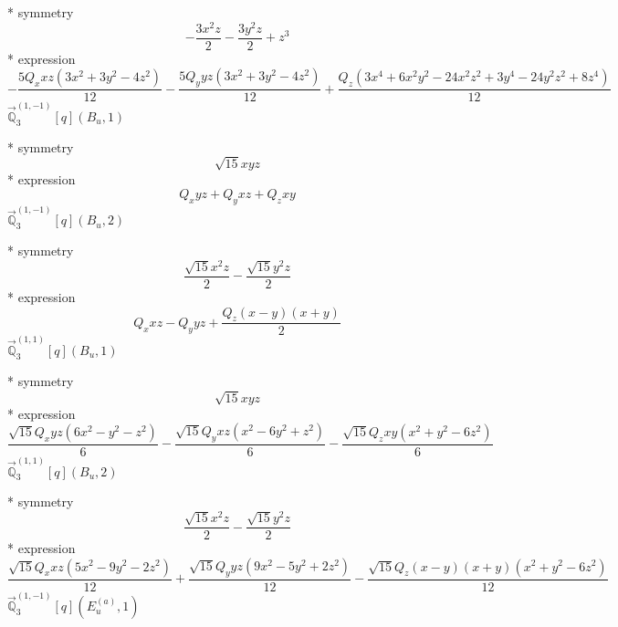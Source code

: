 \documentclass[fleqn,8pt]{jsarticle}
\begin{document}
\noindent\quad ** symmetry
\begin{dmath*}
- \frac{3 x^{2} z}{2} - \frac{3 y^{2} z}{2} + z^{3}
\end{dmath*}
\noindent\quad ** expression
\begin{dmath*}
- \frac{5 Q_{x} x z \left(3 x^{2} + 3 y^{2} - 4 z^{2}\right)}{12} - \frac{5 Q_{y} y z \left(3 x^{2} + 3 y^{2} - 4 z^{2}\right)}{12} + \frac{Q_{z} \left(3 x^{4} + 6 x^{2} y^{2} - 24 x^{2} z^{2} + 3 y^{4} - 24 y^{2} z^{2} + 8 z^{4}\right)}{12}
\end{dmath*}
\noindent\quad $\vec{\mathbb{Q}}_{3}^{(1,-1)}[q](B_{u},1)$

\noindent\quad ** symmetry
\begin{dmath*}
\sqrt{15} x y z
\end{dmath*}
\noindent\quad ** expression
\begin{dmath*}
Q_{x} y z + Q_{y} x z + Q_{z} x y
\end{dmath*}
\noindent\quad $\vec{\mathbb{Q}}_{3}^{(1,-1)}[q](B_{u},2)$

\noindent\quad ** symmetry
\begin{dmath*}
\frac{\sqrt{15} x^{2} z}{2} - \frac{\sqrt{15} y^{2} z}{2}
\end{dmath*}
\noindent\quad ** expression
\begin{dmath*}
Q_{x} x z - Q_{y} y z + \frac{Q_{z} \left(x - y\right) \left(x + y\right)}{2}
\end{dmath*}
\noindent\quad $\vec{\mathbb{Q}}_{3}^{(1,1)}[q](B_{u},1)$

\noindent\quad ** symmetry
\begin{dmath*}
\sqrt{15} x y z
\end{dmath*}
\noindent\quad ** expression
\begin{dmath*}
\frac{\sqrt{15} Q_{x} y z \left(6 x^{2} - y^{2} - z^{2}\right)}{6} - \frac{\sqrt{15} Q_{y} x z \left(x^{2} - 6 y^{2} + z^{2}\right)}{6} - \frac{\sqrt{15} Q_{z} x y \left(x^{2} + y^{2} - 6 z^{2}\right)}{6}
\end{dmath*}
\noindent\quad $\vec{\mathbb{Q}}_{3}^{(1,1)}[q](B_{u},2)$

\noindent\quad ** symmetry
\begin{dmath*}
\frac{\sqrt{15} x^{2} z}{2} - \frac{\sqrt{15} y^{2} z}{2}
\end{dmath*}
\noindent\quad ** expression
\begin{dmath*}
\frac{\sqrt{15} Q_{x} x z \left(5 x^{2} - 9 y^{2} - 2 z^{2}\right)}{12} + \frac{\sqrt{15} Q_{y} y z \left(9 x^{2} - 5 y^{2} + 2 z^{2}\right)}{12} - \frac{\sqrt{15} Q_{z} \left(x - y\right) \left(x + y\right) \left(x^{2} + y^{2} - 6 z^{2}\right)}{12}
\end{dmath*}
\noindent\quad $\vec{\mathbb{Q}}_{3}^{(1,-1)}[q](E_{u}^{(a)},1)$
\end{document}
